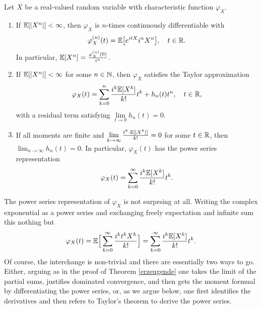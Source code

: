 \begin{lsatz}
\begin{theorem}\label{theorem_moments}
	Let $X$ be a real-valued random variable with characteristic function $\varphi_X$.
	\begin{enumerate}[label=(\roman*)]
		\item
			If $\mathbb{E}[ \lvert X^n \rvert ] < \infty$, then $\varphi_X$ is $n$-times continuously differentiable with $$ \varphi_X^{(n)}(t) = \mathbb{E} \big[ e^{itX}i^n X^n \big], \quad t \in \mathbb{R}.$$
			In particular, $\mathbb{E}[X^n]=\frac{\varphi^{(n)}_X(0)}{i^n }$.
		\item
			If $\mathbb{E} [ \lvert X^n \rvert ] < \infty$ for some $n\in\mathbb{N}$, then $\varphi_X$ satisfies the Taylor approximation
			\begin{align}\label{Taylor}
				\varphi_X(t) = \sum_{k=0}^n \frac{i^k \mathbb{E}[X^k]}{k!} t^k + h_n(t)t^n, \quad t\in \mathbb{R},
			\end{align}
			with a residual term satisfying $\lim\limits_{t \to 0} h_n(t) =0$.
		\item
			If all moments are finite and $\lim\limits_{k \to \infty} \frac{t^k \cdot \mathbb{E} [ \lvert X^k \rvert ]}{k!} = 0$ for some $t\in\mathbb{R}$, then $\lim_{n\to\infty} h_n(t) =0$. In particular, $\varphi_X(t)$ has the power series representation
			\begin{align*}
				\varphi_X(t) = \sum_{k=0}^{\infty} \frac{i^k \mathbb{E}[X^k]}{k!}t^k.
			\end{align*}
	\end{enumerate}
\end{theorem}
\end{lsatz}
The power series representation of $\varphi_X$ is not surprsing at all. Writing the complex exponential as a power series and exchanging freely expectation and infinite sum this nothing but
\begin{align*}
	\varphi_X(t)=\mathbb{E}\Big[\sum_{k=0}^\infty \frac{i^kt^kX^k}{k!}\Big]=\sum_{k=0}^\infty \frac{i^k\mathbb{E}[X^k]}{k!}t^k.
\end{align*}
Of course, the interchange is non-trivial and there are essentially two ways to go. Either, arguing as in the proof of Theorem \ref{erzeugende} one takes the limit of the partial sums, justifies dominated convergence, and then gets the moment formual by differentiating the power series, or, as we argue below, one first identifies the derivatives and then refers to Taylor's theorem to derive the power series.
